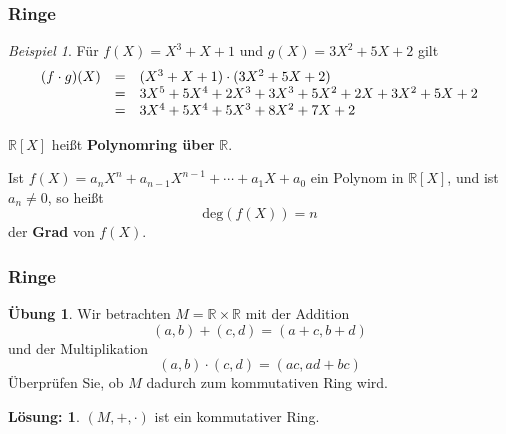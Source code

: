 \documentclass[hyperref={pdfpagelabels=false}]{beamer}
\theoremstyle{plain}%
\theoremstyle{definition}
\newtheorem*{uebung}{Übung}
\newtheorem*{sol}{Lösung:}
\theoremstyle{remark}
\newtheorem*{beispiel}{Beispiel}
\def \R{\mathbb R}
\begin{document}
\begin{frame}
\frametitle{Ringe}

\begin{beispiel}
Für $f(X) = X^3+X + 1$ und $g(X) =3X^2+5X +2$ gilt 
	$$ \begin{array} {l c l}
	(f \cdot g)(X) & = & (X^3+X +1) \cdot (3 X^2 + 5X + 2) \\ 
	& = & 3 X^5 + 5 X^4 + 2 X^3 + 3X^3 +5 X^2 + 2X + 3X^2 + 5 X + 2 \\
	& = & 3 X^4 +5 X^4 + 5 X^3 + 8 X^2 + 7 X + 2 \\
	\end{array} $$
\end{beispiel}

\pause 

\begin{definition} $\R [X]$ heißt \textbf{Polynomring über } $\R $. 
\end{definition}

\pause 

\begin{definition}
Ist $f(X) = a_n X^n + a_{n-1} X^{n-1} + \cdots + a_1 X + a_0$ ein Polynom in $\R[X]$, und ist 
$a_n \neq 0$, so heißt 
	$$ \mathrm{deg}(f(X)) = n $$
der \textbf{Grad} von $f(X)$. 
\end{definition}

\end{frame}

\begin{frame}
\frametitle{Ringe}

\begin{uebung}
Wir betrachten $M = \R \times \R$ mit der Addition 
	$$ (a,b) + (c,d) = (a+c, b+d) $$
und der Multiplikation 
	$$ (a,b) \cdot (c,d) = (ac, ad + bc)  $$
\pause 
Überprüfen Sie, ob $M$ dadurch zum kommutativen Ring wird. 
\end{uebung}

\bigbreak

\pause \pause 
\begin{sol}
$(M,+,\cdot)$ ist ein kommutativer Ring.
\end{sol}

\end{frame}
\end{document}
